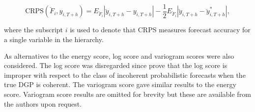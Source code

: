 \documentclass[graybox]{svmult}
\begin{document}
\begin{equation*}
\text{CRPS}(\breve{F}_i,y_{i,T+h}) = E_{\breve{F}_i}|\breve{y}_{i,T+h}-y_{i,T+h}| - \frac{1}{2}E_{\breve{F}_i}|\breve{y}_{i,T+h}-\breve{y}^*_{i,T+h}|,
\end{equation*}

where the subscript $i$ is used to denote that CRPS measures forecast accuracy for a single variable in the hierarchy.

As alternatives to the energy score, log score and variogram scores were also considered.  The log score was disregarded since \cite{GamEtAl2018} prove that the log score is improper with respect to the class of incoherent probabilistic forecasts when the true DGP is coherent.  {\color{orange}The variogram score gave similar results to the energy score. Variogram score results are omitted for brevity but these are available from the authors upon request.}


%
%
%
%
%
%
%
\end{document}
